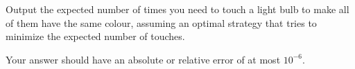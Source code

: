 
    Output the expected number of times you need to touch a light bulb
    to make all of them have the same colour,
    assuming an optimal strategy that tries to minimize the expected number of touches.

    Your answer should have an absolute or relative error of at most $10^{-6}$.
